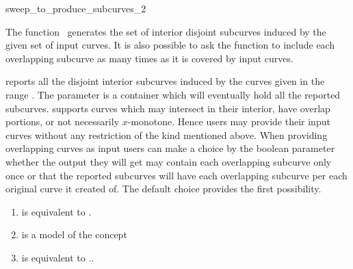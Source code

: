 

\begin{ccRefFunction}{sweep_to_produce_subcurves_2}  %


\ccDefinition

The function \ccRefName\ generates the set of interior disjoint
subcurves induced by the given set of input curves. It is also
possible to ask the function to include each overlapping subcurve
as many times as it is covered by input curves.

\def\ccLongParamLayout{\ccTrue} 

   {reports all the disjoint interior subcurves induced by the curves
   given in the range \ccStyle{[curves_begin, curves_end)}. The
   parameter  is a container which will eventually
   hold all the reported
   subcurves.  supports
   curves which may intersect in their interior, 
   have overlap portions, or not necessarily $x$-monotone. 
   Hence users may provide their input curves without any
   restriction of the kind mentioned above. When providing overlapping
   curves as input users can make a choice by the boolean parameter
    whether the output they will get may contain
   each overlapping subcurve only once or that the reported subcurves
   will have each overlapping subcurve per each original curve it
   created of. The default choice provides the first possibility.}

\begin{enumerate}
   \item    {} is equivalent to .
   \item    {} is a model of the  concept
   \item    {} is equivalent to ..
\end{enumerate}


\end{ccRefFunction}
